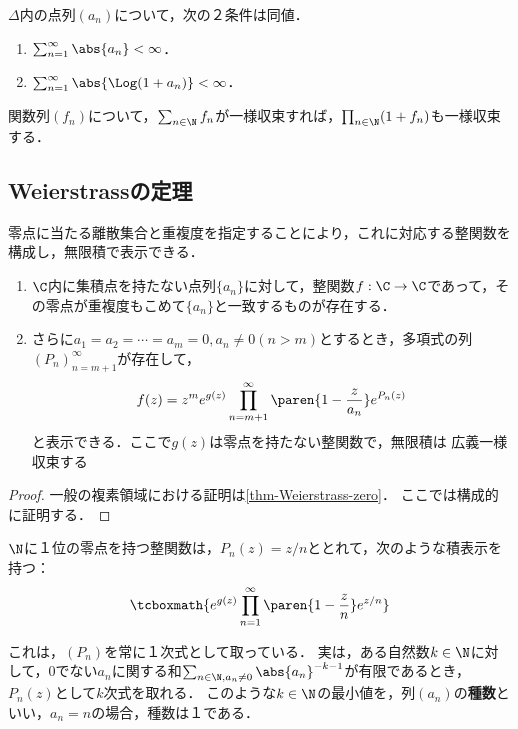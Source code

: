 \documentclass[uplatex, dvipdfmx]{jsreport}
\begin{document}
\begin{proposition}
    $\Delta$内の点列$(a_n)$について，次の２条件は同値．
    \begin{enumerate}
        \item $\sum^\infty_{n=1}\abs{a_n}<\infty$．
        \item $\sum^\infty_{n=1}\abs{\Log(1+a_n)}<\infty$．
    \end{enumerate}
\end{proposition}

\begin{theorem}
    関数列$(f_n)$について，$\sum_{n\in\N}f_n$が一様収束すれば，$\prod_{n\in\N}(1+f_n)$も一様収束する．
\end{theorem}

\subsection{Weierstrassの定理}

\begin{tcolorbox}[colframe=ForestGreen, colback=ForestGreen!10!white,breakable,colbacktitle=ForestGreen!40!white,coltitle=black,fonttitle=\bfseries\sffamily,
title=]
    零点に当たる離散集合と重複度を指定することにより，これに対応する整関数を構成し，無限積で表示できる．
\end{tcolorbox}

\begin{theorem}[Weierstrass]\mbox{}\label{thm-Weierstrass-pre}
    \begin{enumerate}
        \item $\C$内に集積点を持たない点列$\{a_n\}$に対して，整関数$f:\C\to\C$であって，その零点が重複度もこめて$\{a_n\}$と一致するものが存在する．
        \item さらに$a_1=a_2=\cdots=a_m=0,a_n\ne0(n>m)$とするとき，多項式の列$(P_n)_{n=m+1}^\infty$が存在して，\[f(z)=z^me^{g(z)}\prod_{n=m+1}^\infty\paren{1-\frac{z}{a_n}}e^{P_n(z)}\]
        と表示できる．ここで$g(z)$は零点を持たない整関数で，無限積は
        広義一様収束する
    \end{enumerate}
\end{theorem}
\begin{proof}
    一般の複素領域における証明は\ref{thm-Weierstrass-zero}．
    ここでは構成的に証明する．
\end{proof}

\begin{example}
    $\N$に１位の零点を持つ整関数は，$P_n(z)=z/n$ととれて，次のような積表示を持つ：
    \[\tcboxmath{e^{g(z)}\prod^{\infty}_{n=1}\paren{1-\frac{z}{n}}e^{z/n}}\]
\end{example}
\begin{remark}[genus]
    これは，$(P_n)$を常に１次式として取っている．
    実は，ある自然数$k\in\N$に対して，$0$でない$a_n$に関する和$\sum_{n\in\N,a_n\ne0}\abs{a_n}^{-k-1}$が有限であるとき，$P_n(z)$として$k$次式を取れる．
    このような$k\in\N$の最小値を，列$(a_n)$の\textbf{種数}といい，$a_n=n$の場合，種数は１である．
\end{remark}
\end{document}
